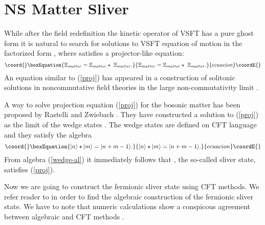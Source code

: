\documentclass[a4paper,12pt]{article}
\begin{document}

\section{NS Matter Sliver}

While after the field redefinition the kinetic operator of VSFT
has a pure ghost form it is natural to search for solutions to
VSFT equation of motion
in the factorized form \coordHE{},
where \coordHE{} satisfies a
projector-like equation:
\begin{equation}\coord{}\boxEquation{
\Xi_{matter}=\Xi_{matter}\star~\Xi_{matter}. \label{proj}
}{
\Xi_{matter}=\Xi_{matter}\star~\Xi_{matter}. }{ecuacion}\coordE{}\end{equation}
An equation similar to (\ref{proj}) has appeared in a construction
of solitonic solutions in noncommutative field theories in the
large non-commutativity limit \cite{GMS}.

A way to solve projection equation (\ref{proj}) for
the bosonic matter has been proposed by Rastelli and Zwiebach
\cite{zwiebach}. They have constructed a solution to (\ref{proj})
as the \coordHE{} limit of the wedge states \coordHE{}.
The wedge states are defined on CFT language and they satisfy the
algebra
\begin{equation}\coord{}\boxEquation{
|n\rangle\star |m\rangle=|n+m-1\rangle. \label{wedge-al}
}{
|n\rangle\star |m\rangle=|n+m-1\rangle. }{ecuacion}\coordE{}\end{equation}
From algebra (\ref{wedge-al}) it immediately follows that \myHighlight{$|\infty\rangle$}\coordHE{},
the so-called sliver state, satisfies (\ref{proj}).

Now we are going to construct the fermionic sliver state using CFT methods.
We refer reader to \cite{ia_nsms} in order to find the algebraic construction
of the fermionic sliver state. We have to note that numeric calculations show
a conspicous agreement between algebraic and CFT methods \cite{ia_nsms}.
\end{document}
